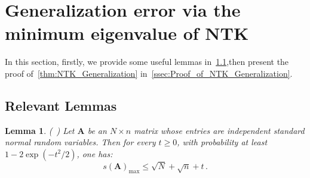 \documentclass[nohyperref]{article}
\theoremstyle{plain}
\newtheorem{lemma}{Lemma}
\theoremstyle{definition}
\theoremstyle{remark}
\begin{document}
\section{Generalization error via the minimum eigenvalue of NTK}
\label{sec:Relationship_NTK_Generalization}


In this section, firstly, we provide some useful lemmas in~\cref{ssec:relevant_lemmas_generalization},then present the proof of~\cref{thm:NTK_Generalization} in~\cref{ssec:Proof_of_NTK_Generalization}.

\subsection{Relevant Lemmas}
\label{ssec:relevant_lemmas_generalization}


\begin{lemma}
\label{lemma:bound_for_Gaussian_matrix_fabinus_norm}
(~\citet[Theorem 4.4.5]{vershynin12}) Let $\bm{A}$ be an $N \times n$ matrix whose entries are independent standard normal random variables. Then for every $t \geq 0$, with probability at least $1-2\exp(-t^2/2)$, one has:
\begin{equation*}
s(\bm{A})_{\max} \leq \sqrt{N} + \sqrt{n} +t\,.
\end{equation*}
\end{lemma}
\end{document}
